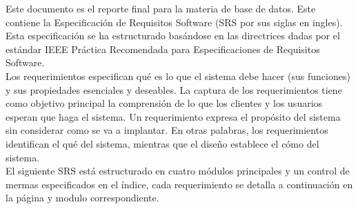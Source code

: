 \documentclass[a4paper,DIV=12]{scrreprt}
\begin{document}
Este documento es  el reporte final para la materia de base de datos. Este contiene la Especificación de Requisitos Software (SRS por sus siglas en ingles). Esta especificación se ha estructurado basándose en las directrices dadas por el estándar IEEE Práctica Recomendada para Especificaciones de Requisitos Software.\\


Los requerimientos especifican qué es lo que el sistema debe hacer (sus
funciones) y sus propiedades esenciales y deseables. La captura de los requerimientos tiene como objetivo principal la comprensión de lo que los clientes y los usuarios esperan que haga el sistema. Un requerimiento expresa el propósito del sistema sin considerar como se va a implantar. En otras palabras, los requerimientos identifican el qué del sistema, mientras que el diseño establece el cómo del sistema.\\
El siguiente SRS está estructurado en cuatro módulos principales y un control de mermas especificados en el índice, cada requerimiento se detalla a continuación en la página y modulo correspondiente.\\




\end{document}

